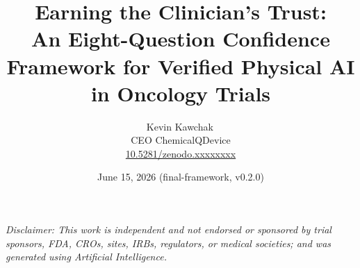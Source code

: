 \documentclass[11pt]{article}
\title{Earning the Clinician's Trust:\\ An Eight-Question Confidence Framework for Verified Physical AI in Oncology Trials}
\author{Kevin Kawchak\,\orcidicon{0009-0007-5457-8667}\\ CEO ChemicalQDevice\\ \href{https://doi.org/10.5281/zenodo.xxxxxxxx}{10.5281/zenodo.xxxxxxxx}}
\date{June 15, 2026 \quad (final-framework, v0.2.0)}
\begin{document}
\maketitle
\thispagestyle{empty}

\begin{abstract}

\end{abstract}

\vspace{0.2em}\noindent\footnotesize\textit{Disclaimer: This work is independent
and not endorsed or sponsored by trial sponsors, FDA, CROs, sites, IRBs,
regulators, or medical societies; and was generated using Artificial
Intelligence.}\normalsize\par




\tableofcontents
\vspace{0.3cm}










\clearpage


\clearpage
{}
\begingroup\raggedright\nocite{*}\endgroup


\end{document}
